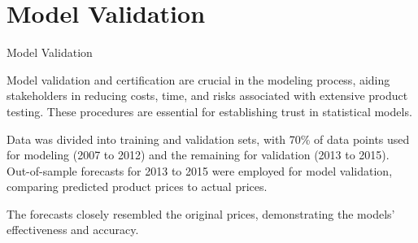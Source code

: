 \documentclass{beamer}
\newcommand{\vspaceFive}{\vspace{5pt}}
\begin{document}
	\section{Model Validation}
	\begin{frame}{Model Validation}
		
		\begin{block}{}
			Model validation and certification are crucial in the modeling process, aiding stakeholders in reducing costs, time, and risks associated with extensive product testing. These procedures are essential for establishing trust in statistical models. 
		\end{block}
		
		\begin{block}{}
			Data was divided into training and validation sets, with 70\% of data points used for modeling (2007 to 2012) and the remaining for validation (2013 to 2015). Out-of-sample forecasts for 2013 to 2015 were employed for model validation, comparing predicted product prices to actual prices. 
		\end{block}
		
		\begin{block}{}
			\vspaceFive
			The forecasts closely resembled the original prices, demonstrating the models' effectiveness and accuracy.
			\vspaceFive
		\end{block}
		
		
	\end{frame}
	
\end{document}
